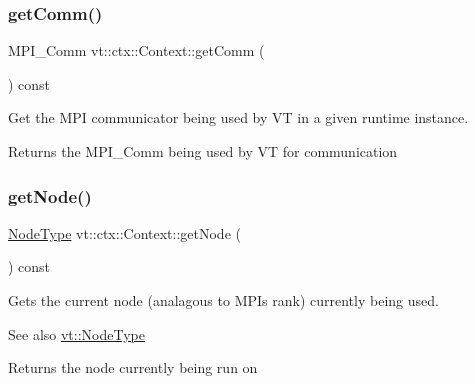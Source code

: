 \subsubsection{\texorpdfstring{get\+Comm()}{getComm()}}
{\footnotesize\ttfamily M\+P\+I\+\_\+\+Comm vt\+::ctx\+::\+Context\+::get\+Comm (\begin{DoxyParamCaption}{ }\end{DoxyParamCaption}) const\hspace{0.3cm}{\ttfamily [inline]}}



Get the M\+PI communicator being used by VT in a given runtime instance. 

\begin{DoxyReturn}{Returns}
the {\ttfamily M\+P\+I\+\_\+\+Comm} being used by VT for communication 
\end{DoxyReturn}
\mbox{\label{structvt_1_1ctx_1_1_context_a0d52c263ce8516546a67443d9a86fa5f}} 
\subsubsection{\texorpdfstring{get\+Node()}{getNode()}}
{\footnotesize\ttfamily \hyperlink{namespacevt_a866da9d0efc19c0a1ce79e9e492f47e2}{Node\+Type} vt\+::ctx\+::\+Context\+::get\+Node (\begin{DoxyParamCaption}{ }\end{DoxyParamCaption}) const\hspace{0.3cm}{\ttfamily [inline]}}



Gets the current node (analagous to M\+PI\textquotesingle{}s rank) currently being used. 

\begin{DoxySeeAlso}{See also}
{\ttfamily \hyperlink{namespacevt_a866da9d0efc19c0a1ce79e9e492f47e2}{vt\+::\+Node\+Type}} 
\end{DoxySeeAlso}
\begin{DoxyReturn}{Returns}
the node currently being run on 
\end{DoxyReturn}
\mbox{\label{structvt_1_1ctx_1_1_context_a7f41071aadf6d5fa9e1b6c703c5ff19d}} 
